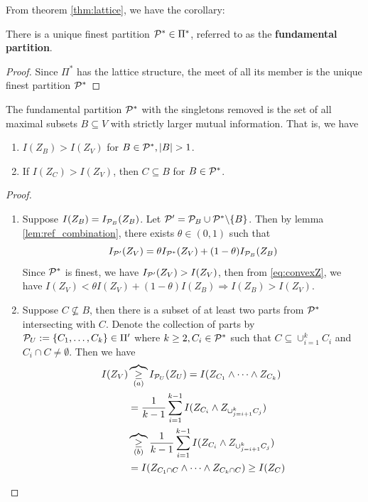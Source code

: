 \documentclass{article}
\begin{document}
From theorem \ref{thm:lattice}, we have the corollary:
\begin{corollary}
There is a unique finest partition $\P^* \in \Pi^*$, referred to as the \textbf{fundamental partition}.
\end{corollary}
\begin{proof}
Since $\Pi^*$ has the lattice structure, the meet of all its member is the unique finest partition $\P^*$
\end{proof}
\begin{theorem}\label{thm:strict_larger_mi}
The fundamental partition $\P^*$ with the singletons removed is the set of all maximal subsets $B \subseteq V$ with strictly larger mutual information. 
That is, we have
\begin{enumerate}
\item $I(Z_B) > I(Z_V)$ for $B \in \P^*, \abs{B}>1$.
\item If $I(Z_C) > I(Z_V)$, then $C\subseteq B$ for $B \in \P^*$.
\end{enumerate}
\end{theorem}
\begin{proof}
\begin{enumerate}
\item
Suppose $I(Z_B)=I_{\P_B}(Z_B)$.
Let $\P' = \P_B \cup  \P^* \backslash \{B\}$.
Then by lemma \ref{lem:ref_combination}, there exists $\theta \in (0,1)$ such that 
\begin{equation}\label{eq:convexZ}
I_{\P'}(Z_V) = \theta I_{\P^*}(Z_V) + (1-\theta) I_{\P_B}(Z_B)
\end{equation}
Since $\P^*$ is finest, we have $I_{\P'}(Z_V) > I(Z_V)$, then from \eqref{eq:convexZ}, we have 
$I(Z_V) < \theta I(Z_V) + (1-\theta) I(Z_B) \Rightarrow I(Z_B) > I(Z_V)$.

\item Suppose $C \not\subseteq B$, then there is a subset of at least two parts from $\P^*$ intersecting with $C$. Denote the collection of parts by $\P_U :=\{C_1, \dots, C_k\} \in \Pi'$ where 
$k \geq 2, C_i \in \P^* $ such that $C \subseteq \cup_{i=1}^k C_i$ and $C_i \cap C \neq \emptyset$.
Then we have
\begin{align*}
I(Z_V) & \overbrace{\geq}_{(a)} I_{\P_U}(Z_U)  = I(Z_{C_1} \wedge \dots \wedge Z_{C_k})\\
& = {1\over k-1}\sum_{i=1}^{k-1} I(Z_{C_i} \wedge Z_{\cup_{j=i+1}^k C_j}) \\
& \overbrace{\geq}_{(b)} {1\over k-1}\sum_{i=1}^{k-1} I(Z_{C_i} \wedge Z_{\cup_{j=i+1}^k C_j}) \\
& = I(Z_{C_1 \cap C} \wedge \dots \wedge Z_{C_k \cap C}) \geq I(Z_C)
\end{align*}
\end{enumerate}
\end{proof}
\end{document}
